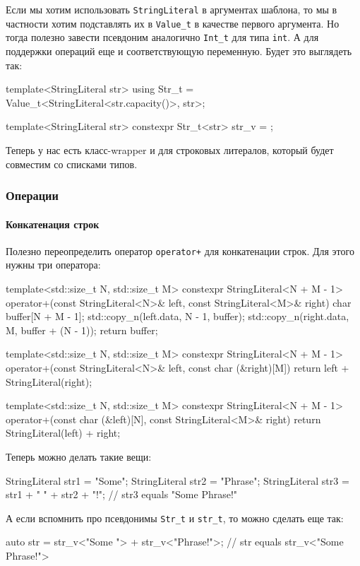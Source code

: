 Если мы хотим использовать \verb"StringLiteral" в аргументах шаблона, то мы в частности хотим подставлять их в \verb"Value_t" в качестве первого аргумента.
Но тогда полезно завести псевдоним аналогично \verb"Int_t" для типа \verb"int".
А для поддержки операций еще и соответствующую переменную.
Будет это выглядеть так:
\begin{cppcode}
template<StringLiteral str>
using Str_t = Value_t<StringLiteral<str.capacity()>, str>;

template<StringLiteral str>
constexpr Str_t<str> str_v = {};
\end{cppcode}
Теперь у нас есть класс-wrapper и для строковых литералов, который будет совместим со списками типов.

\subsubsection{Операции}

\paragraph{Конкатенация строк}

Полезно переопределить оператор \verb"operator+" для конкатенации строк.
Для этого нужны три оператора:
\begin{cppcode}
template<std::size_t N, std::size_t M>
constexpr StringLiteral<N + M - 1> operator+(const StringLiteral<N>& left,
                                             const StringLiteral<M>& right) {
  char buffer[N + M - 1]{};
  std::copy_n(left.data, N - 1, buffer);
  std::copy_n(right.data, M, buffer + (N - 1));
  return buffer;
}

template<std::size_t N, std::size_t M>
constexpr StringLiteral<N + M - 1> operator+(const StringLiteral<N>& left,
                                             const char (&right)[M]) {
  return left + StringLiteral(right);
}

template<std::size_t N, std::size_t M>
constexpr StringLiteral<N + M - 1> operator+(const char (&left)[N],
                                             const StringLiteral<M>& right) {
  return StringLiteral(left) + right;
}
\end{cppcode}
Теперь можно делать такие вещи:
\begin{cppcode}
StringLiteral str1 = "Some";
StringLiteral str2 = "Phrase";
StringLiteral str3 = str1 + " " + str2 + "!";
// str3 equals "Some Phrase!"
\end{cppcode}
А если вспомнить про псевдонимы \verb"Str_t" и \verb"str_t", то можно сделать еще так:
\begin{cppcode}
auto str = str_v<"Some "> + str_v<"Phrase!">;
// str equals str_v<"Some Phrase!">
\end{cppcode}

